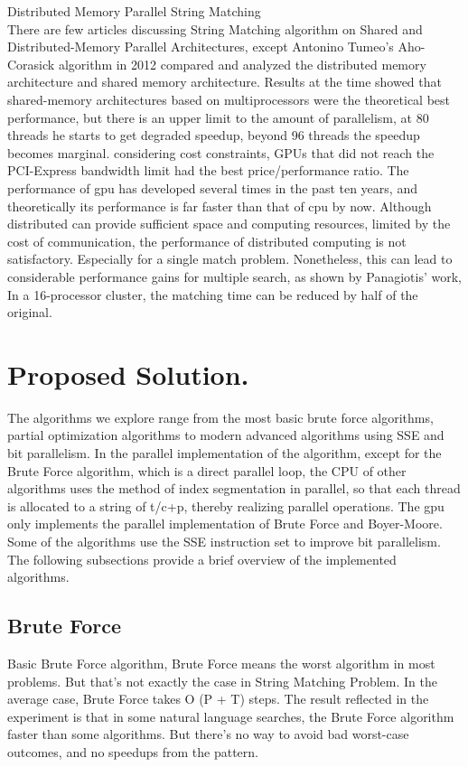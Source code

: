 \documentclass[11pt]{article}       %
\begin{document}
Distributed Memory Parallel String Matching\\
There are few articles discussing String Matching algorithm on Shared and Distributed-Memory Parallel Architectures, except Antonino Tumeo's Aho-Corasick algorithm in 2012 compared and analyzed the distributed memory architecture and shared memory architecture\cite{Distributed-Memory}. Results at the time showed that shared-memory architectures based on multiprocessors were the theoretical best performance, but there is an upper limit to the amount of parallelism, at 80 threads he starts to get degraded speedup, beyond 96 threads the speedup becomes marginal. considering cost constraints, GPUs that did not reach the PCI-Express bandwidth limit had the best price/performance ratio. The performance of gpu has developed several times in the past ten years, and theoretically its performance is far faster than that of cpu by now. Although distributed can provide sufficient space and computing resources, limited by the cost of communication, the performance of distributed computing is not satisfactory. Especially for a single match problem. Nonetheless, this can lead to considerable performance gains for multiple search, as shown by Panagiotis' work\cite{MPI}, In a 16-processor cluster, the matching time can be reduced by half of the original.\\

\section{Proposed Solution.} \label{proposedSolution}

The algorithms we explore range from the most basic brute force algorithms, partial optimization algorithms to modern advanced algorithms using SSE and bit parallelism. In the parallel implementation of the algorithm, except for the Brute Force algorithm, which is a direct parallel loop, the CPU of other algorithms uses the method of index segmentation in parallel, so that each thread is allocated to a string of t/c+p, thereby realizing parallel operations. The gpu only implements the parallel implementation of Brute Force and Boyer-Moore. Some of the algorithms use the SSE instruction set to improve bit parallelism. The following subsections provide a brief overview of the implemented algorithms.

\subsection{Brute Force}\label{bf}
Basic Brute Force algorithm, Brute Force means the worst algorithm in most problems. But that's not exactly the case in String Matching Problem. In the average case, Brute Force takes O (P + T) steps. The result reflected in the experiment is that in some natural language searches, the Brute Force algorithm faster than some algorithms. But there's no way to avoid bad worst-case outcomes, and no speedups from the pattern. 
\end{document}
